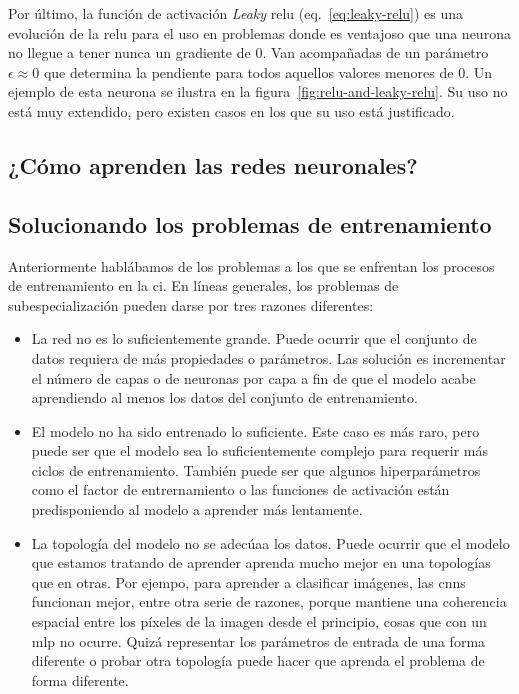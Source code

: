 Por último, la función de activación \textit{Leaky} \gls{relu} (eq.~\ref{eq:leaky-relu}) es una evolución de la \gls{relu} para el uso en problemas donde es ventajoso que una neurona no llegue a tener nunca un gradiente de 0. Van acompañadas de un parámetro $\epsilon \approx 0$ que determina la pendiente para todos aquellos valores menores de 0. Un ejemplo de esta neurona se ilustra en la figura~\ref{fig:relu-and-leaky-relu}. Su uso no está muy extendido, pero existen casos en los que su uso está justificado.

\subsection{¿Cómo aprenden las redes neuronales?}



\subsection{Solucionando los problemas de entrenamiento}

Anteriormente hablábamos de los problemas a los que se enfrentan los procesos de entrenamiento en la \gls{ci}. En líneas generales, los problemas de subespecialización pueden darse por tres razones diferentes:

\begin{itemize}
	\item La red no es lo suficientemente grande. Puede ocurrir que el conjunto de datos requiera de más propiedades o parámetros. Las solución es incrementar el número de capas o de neuronas por capa a fin de que el modelo acabe aprendiendo al menos los datos del conjunto de entrenamiento.
	\item El modelo no ha sido entrenado lo suficiente. Este caso es más raro, pero puede ser que el modelo sea lo suficientemente complejo para requerir más ciclos de entrenamiento. También puede ser que algunos hiperparámetros como el factor de entrernamiento o las funciones de activación están predisponiendo al modelo a aprender más lentamente.
	\item La topología del modelo no se adecúaa los datos. Puede ocurrir que el modelo que estamos tratando de aprender aprenda mucho mejor en una topologías que en otras. Por ejempo, para aprender a clasificar imágenes, las \glspl{cnn} funcionan mejor, entre otra serie de razones, porque mantiene una coherencia espacial entre los píxeles de la imagen desde el principio, cosas que con un \gls{mlp} no ocurre. Quizá representar los parámetros de entrada de una forma diferente o probar otra topología puede hacer que aprenda el problema de forma diferente.
\end{itemize}

